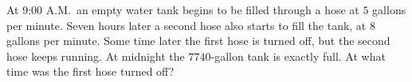 At 9:00 A.M.\ an empty water tank begins to be filled through a hose at $5$ gallons per minute. Seven hours later a second hose also starts to fill the tank, at $8$ gallons per minute. Some time later the first hose is turned off, but the second hose keeps running. At midnight the $7740$-gallon tank is exactly full. At what time was the first hose turned off?
